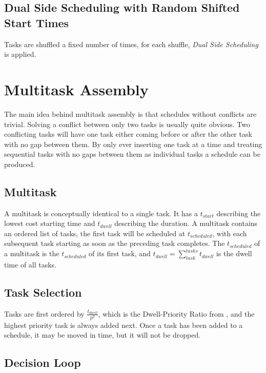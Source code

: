 \documentclass[journal,12pt,onecolumn,draftclsnofoot,]{IEEEtran}
\begin{document}
\subsection{Dual Side Scheduling with Random Shifted Start Times}

Tasks are shuffled a fixed number of times, for each shuffle, \emph{Dual Side Scheduling} is applied.

\section{Multitask Assembly}

The main idea behind multitask assembly is that schedules without conflicts are trivial.
Solving a conflict between only two tasks is usually quite obvious.
Two conflicting tasks will have one task either coming before or after the other task with no gap between them.
By only ever inserting one task at a time and treating sequential tasks with no gaps between them as individual tasks a schedule can be produced.

\subsection{Multitask}

A multitask is conceptually identical to a single task.
It has a $t_{start}$ describing the lowest cost starting time and $t_{dwell}$ describing the duration.
A multitask contains an ordered list of tasks, the first task will be scheduled at $t_{scheduled}$, with each subsequent task starting as soon as the preceding task completes.
The $t_{scheduled}$ of a multitask is the $t_{scheduled}$ of its first task, and $t_{dwell} = \sum_{task}^{tasks}t_{dwell}$ is the dwell time of all tasks.

\subsection{Task Selection}

Tasks are first ordered by $\frac{t_{dwell}}{p^2}$, which is the Dwell-Priority Ratio from \cite{poster}, and the highest priority task is always added next.
Once a task has been added to a schedule, it may be moved in time, but it will not be dropped.

\subsection{Decision Loop}
\end{document}
